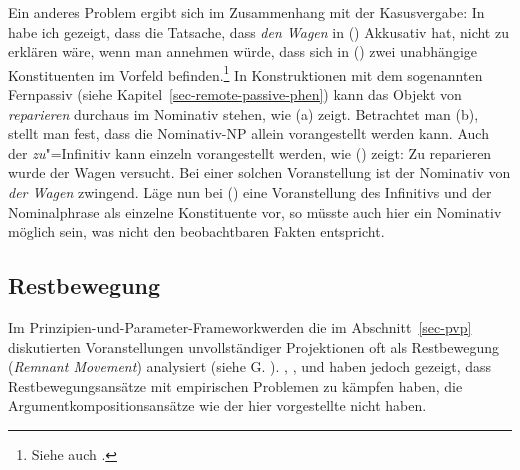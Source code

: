 Ein anderes Problem ergibt sich im Zusammenhang mit der Kasusvergabe:
In  habe ich gezeigt, dass die Tatsache,
dass \emph{den Wagen} in () Akkusativ hat, nicht zu erklären wäre, wenn man annehmen würde,
dass sich in () zwei unabhängige Konstituenten im Vorfeld befinden.\footnote{
  Siehe auch .%
}
\eal 
{}
\zl
In Konstruktionen mit dem sogenannten Fernpassiv (siehe Kapitel~\ref{sec-remote-passive-phen})
kann das Objekt von \emph{reparieren} durchaus im Nominativ stehen, wie (a) zeigt.
Betrachtet man (b), stellt man fest, dass die Nominativ-NP allein vorangestellt werden kann.
\eal
{}
\zl
Auch der \emph{zu}"=Infinitiv kann einzeln vorangestellt werden, wie () zeigt:
\ea
Zu reparieren wurde der Wagen versucht.
\z
Bei einer solchen Voranstellung ist der Nominativ von \emph{der Wagen} zwingend.
Läge nun bei () eine Voranstellung des Infinitivs und der Nominalphrase 
als einzelne Konstituente vor, so müsste auch hier ein Nominativ möglich sein, 
was nicht den beobachtbaren Fakten entspricht.


\subsection{Restbewegung}
\label{sec-restbewegung}

Im Prinzipien-und-Parameter-Framework\indexgb werden die im Abschnitt~\ref{sec-pvp} diskutierten
Voranstellungen unvollständiger Projektionen
oft als Restbewegung (\emph{Remnant Movement}) analysiert (siehe \zb G. \citealp{GMueller96a,GMueller98a}).
\citet[]{Haider93a}, \citet[Kapitel~4.2.5]{deKuthy2002a}, \citet[Abschnitt~2]{dKM2001a} und \citet{Fanselow2002a} haben jedoch gezeigt, 
dass Restbewegungsansätze mit empirischen Problemen zu kämpfen haben, 
die Argumentkompositionsansätze wie der hier vorgestellte nicht haben.%




